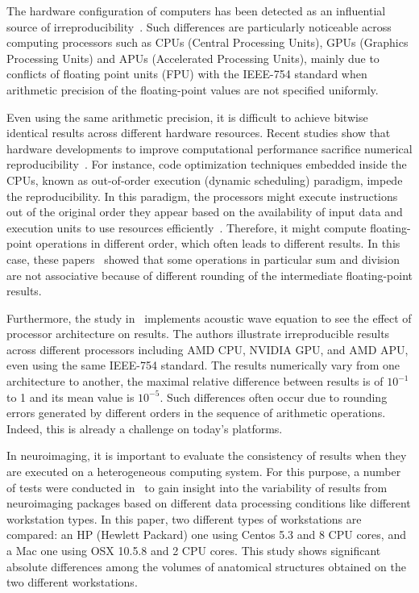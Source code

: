 The hardware configuration of computers has been detected as an 
influential source of irreproducibility~\cite{hill2017numerical}. Such 
differences are particularly noticeable across computing processors 
such as CPUs (Central Processing Units), GPUs (Graphics Processing 
Units) and APUs (Accelerated Processing Units), mainly due to conflicts 
of floating point units (FPU) with the IEEE-754 standard when 
arithmetic precision of the floating-point values are not specified 
uniformly.

Even using the same arithmetic precision, it is difficult to achieve 
bitwise identical results across different hardware resources. 
Recent studies show that hardware developments to improve 
computational performance sacrifice numerical 
reproducibility~\cite{duben2014use, demmel2013numerical}. For instance, 
code optimization techniques embedded inside the CPUs, known as 
out-of-order execution (dynamic scheduling) paradigm, impede the 
reproducibility. In this paradigm, the processors might execute 
instructions out of the original order they appear based on the 
availability of input data and execution units to use resources 
efficiently~\cite{wiki2018out-of-order}. Therefore, it might compute 
floating-point operations in different order, which often leads to 
different results. In this case, 
these papers~\cite{duben2014use, demmel2013numerical} 
showed that some operations in 
particular sum and division are not associative because of different 
rounding of the intermediate floating-point results.

Furthermore, the study in~\cite{jezequel2015estimation} implements 
acoustic wave equation to see the effect of processor architecture on 
results. The authors illustrate irreproducible results across 
different processors including AMD CPU, NVIDIA GPU, and AMD APU, even 
using the same IEEE-754 standard. The results numerically vary from one 
architecture to another, the maximal relative difference between 
results is of $10^{-1}$ to 1 and its mean value is $10^{-5}$. Such 
differences often occur due to rounding errors generated by different 
orders in the sequence of arithmetic operations. Indeed, this is 
already a challenge on today's platforms. 

In neuroimaging, it is important to evaluate the consistency of  
results when they are executed on a heterogeneous computing system. For 
this purpose, a number of tests were conducted 
in~\cite{Gronenschild2012} to gain insight into the variability of  
results from neuroimaging packages based on different data processing 
conditions like different workstation types. In this paper, two 
different types of workstations are compared: an HP (Hewlett Packard) one 
using Centos 5.3 and 8 CPU cores, and a Mac one using OSX 10.5.8 and 2 
CPU cores. This study shows significant absolute differences among 
the volumes of anatomical structures obtained on the two different 
workstations. 


